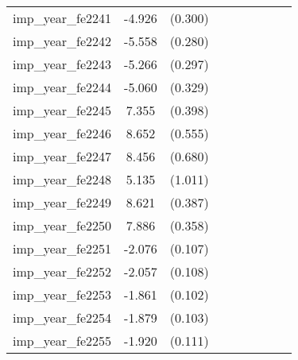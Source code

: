 {\begin{tabular}{l*{4}{cc}}
imp\_year\_fe2241&   -4.926\sym{***}&  (0.300)&                  &         &                  &         &                  &         \\
imp\_year\_fe2242&   -5.558\sym{***}&  (0.280)&                  &         &                  &         &                  &         \\
imp\_year\_fe2243&   -5.266\sym{***}&  (0.297)&                  &         &                  &         &                  &         \\
imp\_year\_fe2244&   -5.060\sym{***}&  (0.329)&                  &         &                  &         &                  &         \\
imp\_year\_fe2245&    7.355\sym{***}&  (0.398)&                  &         &                  &         &                  &         \\
imp\_year\_fe2246&    8.652\sym{***}&  (0.555)&                  &         &                  &         &                  &         \\
imp\_year\_fe2247&    8.456\sym{***}&  (0.680)&                  &         &                  &         &                  &         \\
imp\_year\_fe2248&    5.135\sym{***}&  (1.011)&                  &         &                  &         &                  &         \\
imp\_year\_fe2249&    8.621\sym{***}&  (0.387)&                  &         &                  &         &                  &         \\
imp\_year\_fe2250&    7.886\sym{***}&  (0.358)&                  &         &                  &         &                  &         \\
imp\_year\_fe2251&   -2.076\sym{***}&  (0.107)&                  &         &                  &         &                  &         \\
imp\_year\_fe2252&   -2.057\sym{***}&  (0.108)&                  &         &                  &         &                  &         \\
imp\_year\_fe2253&   -1.861\sym{***}&  (0.102)&                  &         &                  &         &                  &         \\
imp\_year\_fe2254&   -1.879\sym{***}&  (0.103)&                  &         &                  &         &                  &         \\
imp\_year\_fe2255&   -1.920\sym{***}&  (0.111)&                  &         &                  &         &                  &         \\

\end{tabular}}
